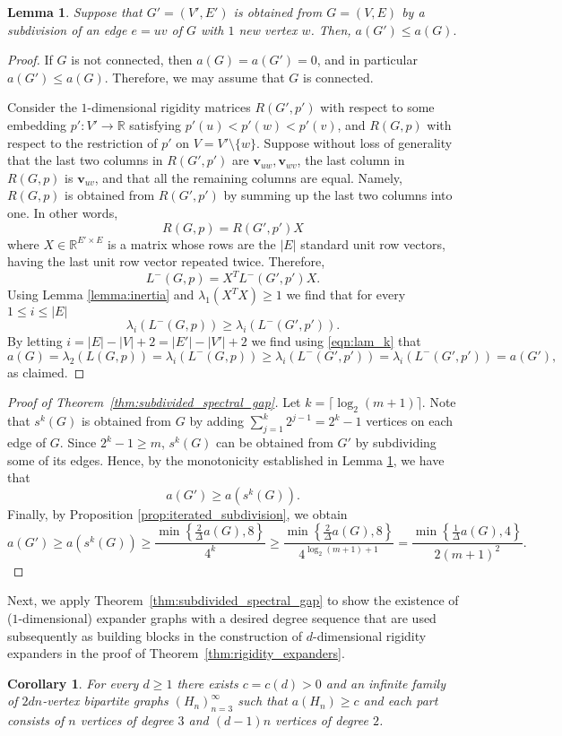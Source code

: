 \documentclass[a4paper,11pt]{article}
\theoremstyle{plain}
\newtheorem{corollary}[theorem]{\bf Corollary}
\newtheorem{lemma}[theorem]{\bf Lemma}
\theoremstyle{definition}
\newcommand{\Rea}{{\mathbb R}}
\newcommand{\bv}{\mathbf v}
\begin{document}
\begin{lemma}\label{lemma:subdivision_second_direction}
Suppose that $G'=(V',E')$ is obtained from $G=(V,E)$ by a subdivision of an edge $e=uv$ of $G$ with $1$ new vertex $w$. Then,
$
    a(G')\leq a(G).
$
\end{lemma}
\begin{proof}
If $G$ is not connected, then $a(G)=a(G')=0$, and in particular $a(G')\leq a(G)$. Therefore, we may assume that $G$ is connected.

Consider the $1$-dimensional rigidity matrices $R(G',p')$ with respect to some embedding $p':V'\to\Rea$ satisfying $p'(u)<p'(w)<p'(v)$, and $R(G,p)$ with respect to the restriction of $p'$ on $V=V'\setminus\{w\}$. Suppose without loss of generality that the last two columns in $R(G',p')$ are $\bv_{uw},\bv_{wv}$, the last column in $R(G,p)$ is $\bv_{uv}$, and that all the remaining columns are equal. Namely, $R(G,p)$ is obtained from $R(G',p')$ by summing up the last two columns into one. In other words,
\[
R(G,p) = R(G',p')X
\]
where $X\in\Rea^{E'\times E}$ is a matrix whose rows are the $|E|$ standard unit row vectors, having the last unit row vector repeated twice.
Therefore,
\[
L^{-}(G,p)= X^T L^{-}(G',p') X.
\]
Using Lemma \ref{lemma:inertia} and $\lambda_1(X^TX) \ge 1$ we find that for every $1\le i\le |E|$
\[
\lambda_i(L^{-}(G,p)) \ge \lambda_i(L^{-}(G',p')).
\]
By letting $i=|E|-|V|+2=|E'|-|V'|+2$ we find using \eqref{eqn:lam_k} that
\[
a(G) = \lambda_2(L(G,p)) = \lambda_i(L^{-}(G,p)) \ge \lambda_i(L^{-}(G',p')) = \lambda_i(L^{-}(G',p')) = a(G'),
\]
as claimed.
\end{proof}


\begin{proof}
[Proof of Theorem~\ref{thm:subdivided_spectral_gap}]
Let $k=\lceil\log_2(m+1)\rceil$. Note that $s^k(G)$ is obtained from $G$ by adding $\sum_{j=1}^k 2^{j-1}= 2^k-1$ vertices on each edge of $G$. Since $2^k-1\geq m$, $s^k(G)$ can be obtained from $G'$ by subdividing some of its edges. Hence, by the monotonicity established in Lemma \ref{lemma:subdivision_second_direction}, we have that
\[
a(G')\geq a(s^k(G)).
\]
Finally, by Proposition \ref{prop:iterated_subdivision}, we obtain
\[
a(G')\geq a(s^k(G))\geq \frac{\min\left\{\frac{2}{\Delta}a(G),8\right\}}{4^k}
\geq \frac{\min\left\{\frac{2}{\Delta}a(G),8\right\}}{4^{\log_2(m+1)+1}}
=\frac{\min\left\{\frac{1}{\Delta}a(G),4\right\}}{2 (m+1)^2}.
\]
\end{proof}

Next, we apply Theorem~\ref{thm:subdivided_spectral_gap} to show the existence of ($1$-dimensional) expander graphs with a desired degree sequence that are used subsequently as building blocks in the construction of $d$-dimensional rigidity expanders in the proof of Theorem~\ref{thm:rigidity_expanders}.  
\begin{corollary}\label{cor:expanders_with_many_degree_2_vertices}
For every $d\geq 1$ there exists $c=c(d)>0$ and an infinite family of  $2dn$-vertex bipartite graphs $(H_n)_{n=3}^{\infty}$ such that $a(H_n)\geq c$ and each part consists of $n$ vertices of degree $3$ and $(d-1)n$ vertices of degree $2$.    
\end{corollary}
\end{document}
